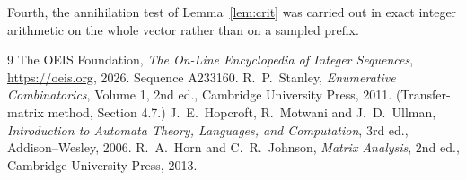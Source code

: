 \documentclass[11pt,a4paper]{article}
\theoremstyle{plain}
\theoremstyle{definition}
\begin{document}
Fourth, the annihilation test of Lemma~\ref{lem:crit} was carried out in exact integer
arithmetic on the whole vector rather than on a sampled prefix.

\begin{thebibliography}{9}
 The OEIS Foundation, \emph{The On-Line Encyclopedia of Integer
Sequences}, \url{https://oeis.org}, 2026. Sequence A233160.
 R.~P.~Stanley, \emph{Enumerative Combinatorics}, Volume 1, 2nd ed.,
Cambridge University Press, 2011. (Transfer-matrix method, Section 4.7.)
 J.~E.~Hopcroft, R.~Motwani and J.~D.~Ullman, \emph{Introduction to Automata
Theory, Languages, and Computation}, 3rd ed., Addison--Wesley, 2006.
 R.~A.~Horn and C.~R.~Johnson, \emph{Matrix Analysis}, 2nd ed., Cambridge
University Press, 2013.
\end{thebibliography}
\end{document}

